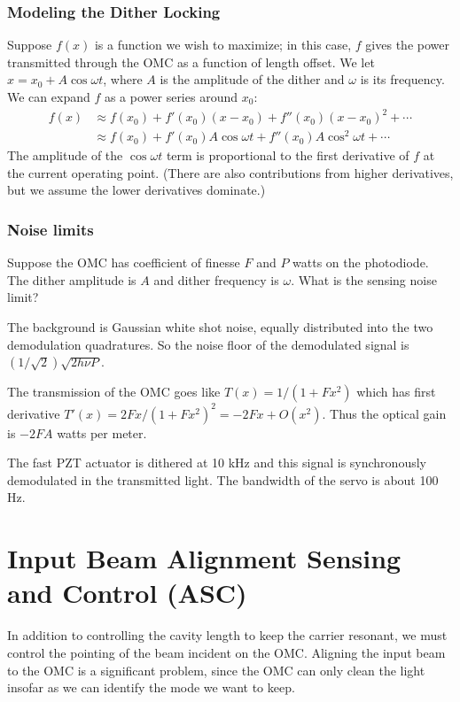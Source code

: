 \subsubsection{Modeling the Dither Locking}

Suppose $f(x)$ is a function we wish to maximize; in this case, $f$
gives the power transmitted through the OMC as a function of length
offset.  We let $x = x_0 + A \cos\omega t$, where $A$ is the amplitude
of the dither and $\omega$ is its frequency.  We can expand $f$ as a
power series around $x_0$: 
\begin{align}
f(x) &\approx f(x_0) + f'(x_0)\left(x - x_0\right) + f''(x_0)\left(x-x_0\right)^2 + \cdots \\
     &\approx f(x_0) + f'(x_0)A\cos\omega t        + f''(x_0)A\cos^2\omega t + \cdots
\end{align}
%
The amplitude of the $\cos\omega t$ term is proportional to the first
derivative of $f$ at the current operating point.  (There are also
contributions from higher derivatives, but we assume the lower
derivatives dominate.)

\subsubsection{Noise limits}

Suppose the OMC has coefficient of finesse $F$ and $P$ watts on the
photodiode.  The dither amplitude is $A$ and dither frequency is
$\omega$.  What is the sensing noise limit?

The background is Gaussian white shot noise, equally distributed into
the two demodulation quadratures.  So the noise floor of the
demodulated signal is $(1/\sqrt{2})\sqrt{2 h \nu P}$.

The transmission of the OMC goes like $T(x) = 1/\left(1 + Fx^2\right)$
which has first derivative $T'(x) = 2 F x / \left(1 + F x^2\right)^2 =
- 2 F x + O(x^2)$.  Thus the optical gain is $-2 F A$ watts per meter.

The fast PZT actuator is dithered at 10 kHz and this signal is
synchronously demodulated in the transmitted light.  The bandwidth of
the servo is about 100 Hz.

\section{Input Beam Alignment Sensing and Control (ASC)}

In addition to controlling the cavity length to keep the carrier
resonant, we must control the pointing of the beam incident on the
OMC.
Aligning the input beam to the OMC is a significant problem, since the OMC
can only clean the light insofar as we can identify the mode we want to
keep.

